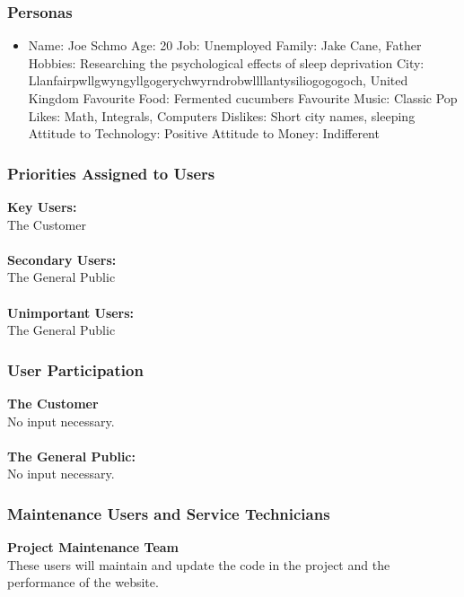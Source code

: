 \documentclass[11pt, oneside]{article}
\begin{document}
\subsubsection{Personas}
\begin{itemize}
\item Name: Joe Schmo
\subitem Age: 20
\subitem Job: Unemployed
\subitem Family: Jake Cane, Father
\subitem Hobbies: Researching the psychological effects of sleep deprivation
\subitem City: Llanfairpwllgwyngyllgogerychwyrndrobwllllantysiliogogogoch, United Kingdom
\subitem Favourite Food: Fermented cucumbers
\subitem Favourite Music: Classic Pop
\subitem Likes: Math, Integrals, Computers
\subitem Dislikes: Short city names, sleeping
\subitem Attitude to Technology: Positive
\subitem Attitude to Money: Indifferent
\end{itemize}


\subsubsection{Priorities Assigned to Users}

\textbf{Key Users:}\\
The Customer\\
\\
\textbf{Secondary Users:}\\
The General Public\\
\\
\textbf{Unimportant Users:}\\
The General Public\\


\subsubsection{User Participation}
\textbf{The Customer}\\
No input necessary.\\
\\
\textbf{The General Public:}\\
No input necessary.\\


\subsubsection{Maintenance Users and Service Technicians}
\textbf{Project Maintenance Team}\\
These users will maintain and update the code in the project and the performance of the website.
\end{document}
